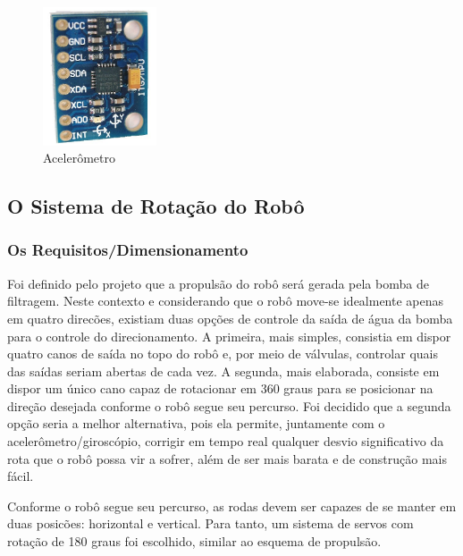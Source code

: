 \begin{description}
\par
\begin{figure}[h]
  \centering
  \includegraphics[width=0.3\textwidth]{figures/accelerometer.png}
  \caption{Acelerômetro}
  \label{fig:gpi}
\end{figure}
\FloatBarrier
\par
\end{description}

\subsection{O Sistema de Rotação do Robô}
\subsubsection{Os Requisitos/Dimensionamento}
Foi definido pelo projeto que a propulsão do robô será gerada pela bomba de filtragem. Neste contexto e considerando que o robô move-se idealmente apenas em quatro direcões, existiam duas opções de controle da saída de água da bomba para o controle do direcionamento. A primeira, mais simples, consistia em dispor quatro canos de saída no topo do robô e, por meio de válvulas, controlar quais das saídas seriam abertas de cada vez. A segunda, mais elaborada, consiste em dispor um único cano capaz de rotacionar em 360 graus para se posicionar na direção desejada conforme o robô segue seu percurso. Foi decidido que a segunda opção seria a melhor alternativa, pois ela permite, juntamente com o acelerômetro/giroscópio, corrigir em tempo real qualquer desvio significativo da rota que o robô possa vir a sofrer, além de ser mais barata e de construção mais fácil.

	Conforme o robô segue seu percurso, as rodas devem ser capazes de se manter em duas posicões: horizontal e vertical. Para tanto, um sistema de servos com rotação de 180 graus foi escolhido, similar ao esquema de propulsão.

